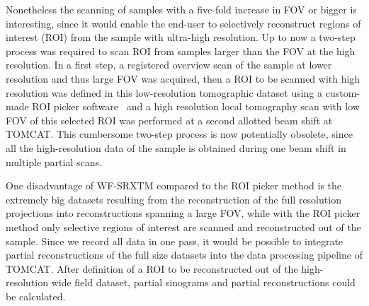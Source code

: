 Nonetheless the scanning of samples with a five-fold increase in FOV or bigger is interesting, since it would enable the end-user to selectively reconstruct regions of interest (ROI) from the sample with ultra-high resolution. Up to now a two-step process was required to scan ROI from samples larger than the FOV at the high resolution. In a first step, a registered overview scan of the sample at lower resolution and thus large FOV was acquired, then a ROI to be scanned with high resolution was defined in this low-resolution tomographic dataset using a custom-made ROI picker software~\cite{Heinzer2008} and a high resolution local tomography scan with low FOV of this selected ROI was performed at a second allotted beam shift at TOMCAT. This cumbersome two-step process is now potentially obsolete, since all the high-resolution data of the sample is obtained during one beam shift in multiple partial scans.

One disadvantage of WF-SRXTM compared to the ROI picker method is the extremely big datasets resulting from the reconstruction of the full resolution projections into reconstructions spanning a large FOV, while with the ROI picker method only selective regions of interest are scanned and reconstructed out of the sample. Since we record all data in one pass, it would be possible to integrate partial reconstructions of the full size datasets into the data processing pipeline of TOMCAT. After definition of a ROI to be reconstructed out of the high-resolution wide field dataset, partial sinograms and partial reconstructions could be calculated.
\cbend
